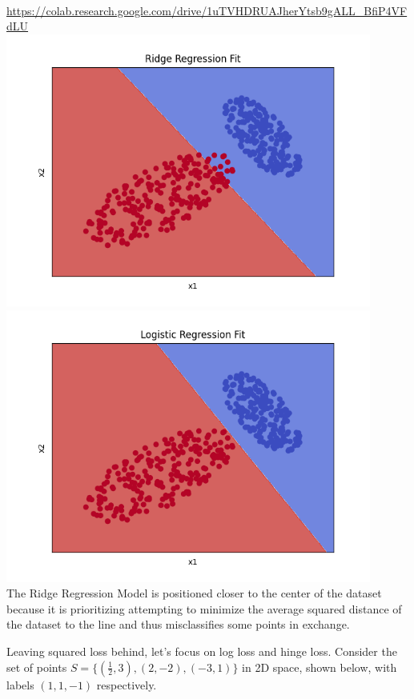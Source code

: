 \begin{solution}
  \\
  \url{https://colab.research.google.com/drive/1uTVHDRUAJherYtsb9gALL_BfiP4VFdLU}
  \\
  \includegraphics[width=12cm]{images/P1_B_ridge.png}
  \\
  \includegraphics[width=12cm]{images/P1_B_logistic.png}
  \\
  The Ridge Regression Model is positioned closer to the center of the dataset because it is prioritizing attempting to minimize the average squared distance of the dataset to the line and thus misclassifies some points in exchange.
\end{solution}

\problem[9]
Leaving squared loss behind, let's focus on log loss and hinge loss. Consider the set of points $S = \{(\frac{1}{2}, 3), (2, -2), (-3, 1)\}$ in 2D space, shown below, with labels $(1, 1, -1)$ respectively.

